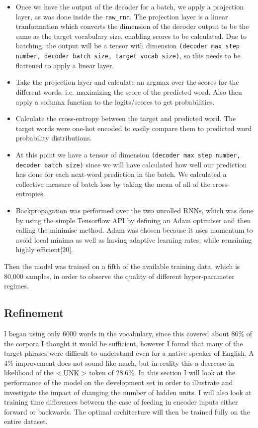 \documentclass[]{article}
\begin{document}
\begin{itemize}
	\item Once we have the output of the decoder for a batch, we apply a projection layer, as was done inside the \lstinline{raw_rnn}. The projection layer is a linear tranformation which converts the dimension of the decoder output to be the same as the target vocabulary size, enabling scores to be calculated. Due to batching, the output will be a tensor with dimension \lstinline{(decoder max step number, decoder batch size, target vocab size)}, so this needs to be flattened to apply a linear layer.
	\item Take the projection layer and calculate an argmax over the scores for the different words. i.e. maximizing the score of the predicted word. Also then apply a softmax function to the logits/scores to get probabilities.
	\item Calculate the cross-entropy between the target and predicted word. The target words were one-hot encoded to easily compare them to predicted word probability distributions.
	\item At this point we have a tensor of dimension \lstinline{(decoder max step number, decoder batch size)} since we will have calculated how well our prediction has done for each next-word prediction in the batch. We calculated a collective measure of batch loss by taking the mean of all of the cross-entropies.
	\item Backpropagation was performed over the two unrolled RNNs, which was done by using the simple Tensorflow API by defining an Adam optimiser and then calling the minimise method. Adam was chosen because it uses momentum to avoid local minima as well as having adaptive learning rates, while remaining highly efficient[20].
\iffalse
\texttt{[image: "C:/Users/mbcxrhm2/Dropbox/PhD/1st year/DrivenTLS/Images/alpha\_ph Dep/Populations/a0p01\_T6000".png]}
![seq2seq at training time](pictures/1-seq2seq.png)
\fi
\end{itemize}
Then the model was trained on a fifth of the available training data, which is 80,000 samples, in order to observe the quality of different hyper-parameter regimes.
\subsection{Refinement}
I began using only 6000 words in the vocabulary, since this covered about 86\% of the corpora I thought it would be sufficient, however I found that many of the target phrases were difficult to understand even for a native speaker of English. A 4\% improvement does not sound like much, but in reality this a decrease in likelihood of the $<\textnormal{UNK}>$ token of 28.6\%.
In this section I will look at the performance of the model on the development set in order to illustrate and investigate the impact of changing the number of hidden units. I will also look at training time differences between the case of feeding in encoder inputs either forward or backwards. The optimal architecture will then be trained fully on the entire dataset.
\end{document}
